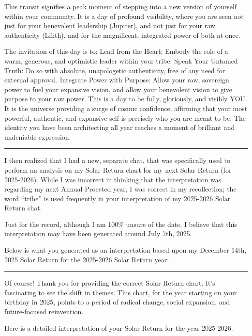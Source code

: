\documentclass{article}
\begin{document}
This transit signifies a peak moment of stepping into a new version of
yourself within your community. It is a day of profound visibility,
where you are seen not just for your benevolent leadership (Jupiter),
and not just for your raw authenticity (Lilith), and for the
magnificent, integrated power of both at once.

The invitation of this day is to: Lead from the Heart: Embody the role
of a warm, generous, and optimistic leader within your tribe. Speak Your
Untamed Truth: Do so with absolute, unapologetic authenticity, free of
any need for external approval. Integrate Power with Purpose: Allow your
raw, sovereign power to fuel your expansive vision, and allow your
benevolent vision to give purpose to your raw power. This is a day to be
fully, gloriously, and visibly YOU. It is the universe providing a surge
of cosmic confidence, affirming that your most powerful, authentic, and
expansive self is precisely who you are meant to be. The identity you
have been architecting all year reaches a moment of brilliant and
undeniable expression.

\begin{center}\rule{0.5\linewidth}{0.5pt}\end{center}

I then realized that I had a new, separate chat, that was
specifically used to perform an analysis on my Solar Return chart for my
next Solar Return (for 2025-2026). While I was incorrect in thinking
that the interpretation was regarding my next Annual Proected year, I
was correct in my recollection; the word ``tribe'' is used frequently in
your interpretation of my 2025-2026 Solar Return chat.

Just for the record, although I am 100\% unsure of the date, I believe
that this interpretation may have been generated around July 7th, 2025.

Below is what you generated as an interpretation based upon my December
14th, 2025 Solar Return for the 2025-2026 Solar Return year:

\begin{center}\rule{0.5\linewidth}{0.5pt}\end{center}

Of course! Thank you for providing the correct Solar Return chart.
It's fascinating to see the shift in themes. This chart, for the year
starting on your birthday in 2025, points to a period of radical change,
social expansion, and future-focused reinvention.

Here is a detailed interpretation of your Solar Return for the year
2025-2026.
\end{document}
